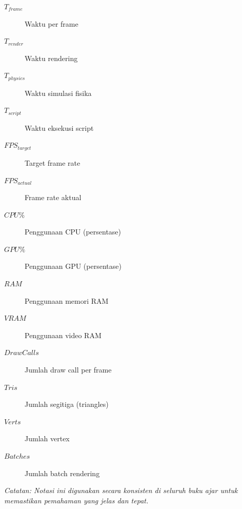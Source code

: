 \begin{description}
    \item[$T_{frame}$] Waktu per frame
    \item[$T_{render}$] Waktu rendering
    \item[$T_{physics}$] Waktu simulasi fisika
    \item[$T_{script}$] Waktu eksekusi script
    \item[$FPS_{target}$] Target frame rate
    \item[$FPS_{actual}$] Frame rate aktual
    \item[$CPU\%$] Penggunaan CPU (persentase)
    \item[$GPU\%$] Penggunaan GPU (persentase)
    \item[$RAM$] Penggunaan memori RAM
    \item[$VRAM$] Penggunaan video RAM
    \item[$DrawCalls$] Jumlah draw call per frame
    \item[$Tris$] Jumlah segitiga (triangles)
    \item[$Verts$] Jumlah vertex
    \item[$Batches$] Jumlah batch rendering
\end{description}

\vspace{1cm}
\textit{Catatan: Notasi ini digunakan secara konsisten di seluruh buku ajar untuk memastikan pemahaman yang jelas dan tepat.}
